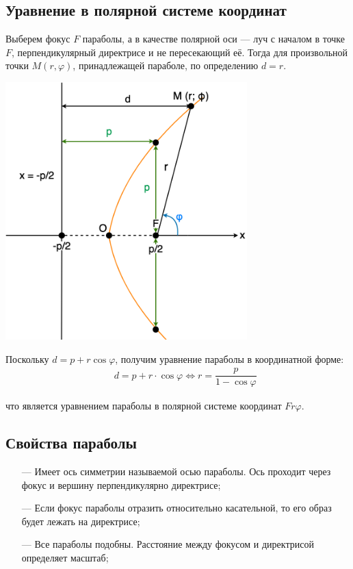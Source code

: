 \documentclass[12pt, fleqn]{extarticle}
\begin{document}
\subsection*{Уравнение в полярной системе координат}

Выберем фокус \(F\) параболы, а в качестве полярной оси — луч с началом в точке \(F\), перпендикулярный директрисе и не пересекающий её.
Тогда для произвольной точки \(M(r, \varphi)\), принадлежащей параболе, по определению \(d = r\).

\begin{center}
    \includegraphics[width=0.7\textwidth]{parabola2.png}
\end{center}

Поскольку \(d = p + r\cos{\varphi}\), получим уравнение параболы в координатной форме:
\begin{align*}
     &  &
    d = p + r \cdot \cos{\varphi}  \iff r = \dfrac{p}{1 - \cos{\varphi}}
\end{align*}

что является уравнением параболы в полярной системе координат \(Fr\varphi\).

\subsection*{Свойства параболы}

\begin{itemize}
    \item[—]{Имеет ось симметрии называемой осью параболы. Ось проходит через фокус и вершину перпендикулярно директрисе;}
    \item[—]{Если фокус параболы отразить относительно касательной, то его образ будет лежать на директрисе;}
    \item[—]{Все параболы подобны. Расстояние между фокусом и директрисой определяет масштаб;}
\end{itemize}
\end{document}
